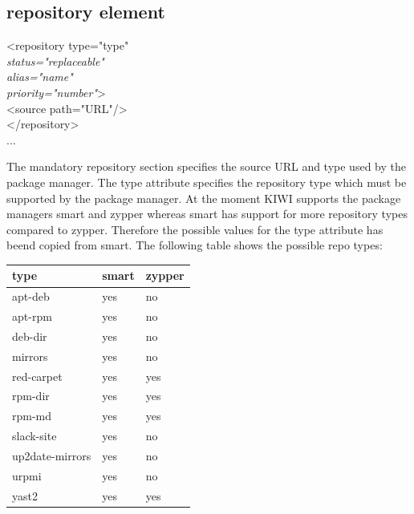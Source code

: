 \subsection{repository element}
\begin{Command}{12cm}
<repository type="type"\\
\hspace*{1cm}\textit{status="replaceable"}\\
\hspace*{1cm}\textit{alias="name"}\\
\hspace*{1cm}\textit{priority="number"}>\\
\hspace*{2cm}<source path="URL"/>\\
</repository>\\
...
\end{Command}

The mandatory repository section specifies the source URL and
type used by the package manager. The type attribute specifies the
repository type which must be supported by the package manager.
At the moment KIWI supports the package managers smart and zypper
whereas smart has support for more repository types compared to
zypper. Therefore the possible values for the type attribute has
beend copied from smart. The following table shows the possible
repo types:\\ 

\begin{tabular}[h]{|p{4cm}|p{2cm}|p{2cm}|}
\hline
\textbf{type} & \textbf{smart} & \textbf{zypper} \\
\hline
apt-deb            & yes & no  \\
apt-rpm            & yes & no  \\
deb-dir            & yes & no  \\
mirrors            & yes & no  \\
red-carpet         & yes & yes \\
rpm-dir            & yes & yes \\
rpm-md             & yes & yes \\ 
slack-site         & yes & no  \\
up2date-mirrors    & yes & no  \\
urpmi              & yes & no  \\
yast2              & yes & yes \\
\hline
\end{tabular}\\

